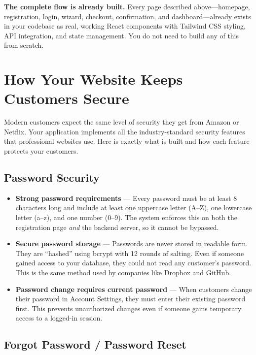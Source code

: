 \documentclass[12pt, letterpaper, oneside]{book}
\begin{document}
\begin{successbox}
\textbf{The complete flow is already built.} Every page described above---homepage, registration, login, wizard, checkout, confirmation, and dashboard---already exists in your codebase as real, working React components with Tailwind CSS styling, API integration, and state management. You do not need to build any of this from scratch.
\end{successbox}

\section{How Your Website Keeps Customers Secure}

Modern customers expect the same level of security they get from Amazon or Netflix. Your application implements all the industry-standard security features that professional websites use. Here is exactly what is built and how each feature protects your customers.

\subsection*{Password Security}

\begin{itemize}[leftmargin=2em]
  \item \textbf{Strong password requirements} --- Every password must be at least 8 characters long and include at least one uppercase letter (A--Z), one lowercase letter (a--z), and one number (0--9). The system enforces this on both the registration page \emph{and} the backend server, so it cannot be bypassed.
  \item \textbf{Secure password storage} --- Passwords are never stored in readable form. They are ``hashed'' using bcrypt with 12 rounds of salting. Even if someone gained access to your database, they could not read any customer's password. This is the same method used by companies like Dropbox and GitHub.
  \item \textbf{Password change requires current password} --- When customers change their password in Account Settings, they must enter their existing password first. This prevents unauthorized changes even if someone gains temporary access to a logged-in session.
\end{itemize}

\subsection*{Forgot Password / Password Reset}
\end{document}
